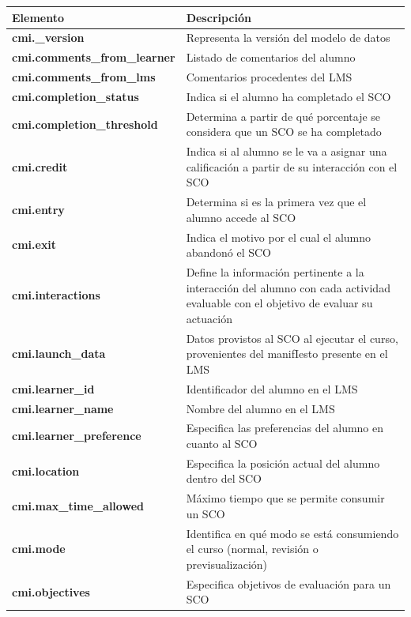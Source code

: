 \begin{table}[H]
\begin{tabular}{|p{2.1in}|p{3.8in}|} \hline 
\textbf{Elemento} & \textbf{Descripción} \\ \hline 
\textbf{cmi.\_version} & Representa la versión del modelo de datos \\ \hline 
\textbf{cmi.comments\_from\_learner } & Listado de comentarios del alumno \\ \hline 
\textbf{cmi.comments\_from\_lms} & Comentarios procedentes del LMS \\ \hline 
\textbf{cmi.completion\_status} & Indica si el alumno ha completado el SCO \\ \hline 
\textbf{cmi.completion\_threshold} & Determina a partir de qué porcentaje se considera que un SCO se ha completado \\ \hline 
\textbf{cmi.credit} & Indica si al alumno se le va a asignar una calificación a partir de su interacción con el SCO \\ \hline 
\textbf{cmi.entry} & Determina si es la primera vez que el alumno accede al SCO \\ \hline 
\textbf{cmi.exit} & Indica el motivo por el cual el alumno abandonó el SCO \\ \hline 
\textbf{cmi.interactions} & Define la información pertinente a la interacción del alumno con cada actividad evaluable con el objetivo de evaluar su actuación \\ \hline 
\textbf{cmi.launch\_data} & Datos provistos al SCO al ejecutar el curso, provenientes del manifIesto presente en el LMS \\ \hline 
\textbf{cmi.learner\_id} & Identificador del alumno en el LMS \\ \hline 
\textbf{cmi.learner\_name} & Nombre del alumno en el LMS \\ \hline 
\textbf{cmi.learner\_preference} & Especifica las preferencias del alumno en cuanto al SCO \\ \hline 
\textbf{cmi.location} & Especifica la posición actual del alumno dentro del SCO \\ \hline 
\textbf{cmi.max\_time\_allowed} & Máximo tiempo que se permite consumir un SCO \\ \hline 
\textbf{cmi.mode} & Identifica en qué modo se está consumiendo el curso (normal, revisión o previsualización) \\ \hline 
\textbf{cmi.objectives} & Especifica objetivos de evaluación para un SCO \\ \hline 

\end{tabular}
\end{table}

